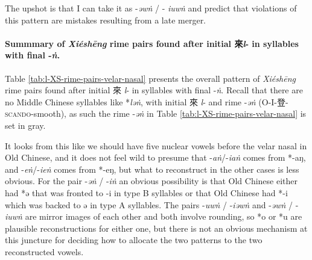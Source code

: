 

The upshot is that I can take it as -\textit{əwṅ} / - \textit{iuwṅ} and predict that violations of this pattern are mistakes resulting from a late merger. 

\paragraph{Summmary of \textit{Xiéshēng} rime pairs found after initial 來\textit{l}- in syllables with final -\textit{ṅ}.}
Table \ref{tab:l-XS-rime-pairs-velar-nasal} presents the overall pattern of \textit{Xiéshēng} rime pairs found after initial 來 \textit{l}- in syllables with final -\textit{ṅ}.
Recall that there are no Middle Chinese syllables like *\textit{ləṅ}, with initial 來 \textit{l}- and rime -\textit{əṅ} (O-I-登-\textsc{scando}-smooth), as such the rime -\textit{əṅ} in  Table \ref{tab:l-XS-rime-pairs-velar-nasal} is set in gray. 

It looks from this like we should have five nuclear vowels before the velar nasal in Old Chinese, and it does not feel wild to presume that -\textit{aṅ}/-\textit{iaṅ}   comes from *-aŋ, and -\textit{eṅ}/-\textit{ieṅ}  comes from *-eŋ, but what to reconstruct in the other cases is less obvious. 
For the pair -\textit{əṅ} / -\textit{iṅ} an obvious possibility is that Old Chinese either had *ə that was fronted to -i in type B syllables or that Old Chinese had *-i which was backed to ə in type A syllables. 
The pairs -\textit{uwṅ} / -\textit{iəwṅ} and -\textit{əwṅ} / -\textit{iuwṅ} are mirror images of each other and both involve rounding, so *o or *u are plausible reconstructions for either one, but there is not an obvious mechanism at this juncture for deciding how to allocate the two patterns to the two reconstructed vowels.



